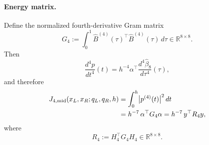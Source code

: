 \paragraph{Energy matrix.}
Define the normalized fourth-derivative Gram matrix
\begin{equation}
\label{eq:phase4_G4}
G_4
:=
\int_0^1
\widehat B^{(4)}(\tau)^\top \widehat B^{(4)}(\tau)\,d\tau
\in\mathbb R^{8\times 8}.
\end{equation}
Then
\[
\frac{d^4p}{dt^4}(t)
=
h^{-4}\alpha^\top \frac{d^4\widehat\beta_8}{d\tau^4}(\tau),
\]
and therefore
\begin{align}
J_{4,\mathrm{mid}}(x_L,x_R;q_L,q_R,h)
&=
\int_0^h \bigl|p^{(4)}(t)\bigr|^2\,dt \notag\\
&=
h^{-7}\,\alpha^\top G_4 \alpha
=
h^{-7}\, y^\top R_4 y,
\label{eq:phase4_middle_energy}
\end{align}
where
\begin{equation}
\label{eq:phase4_R4}
R_4:=H_4^\top G_4 H_4 \in\mathbb R^{8\times 8}.
\end{equation}

